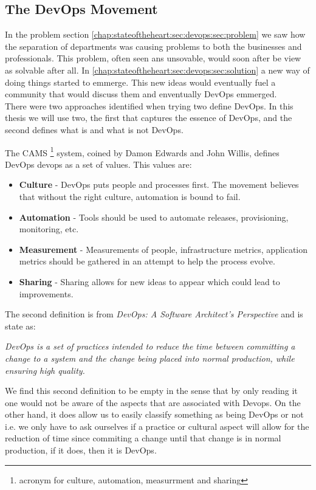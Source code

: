       \subsection{The DevOps Movement} \label{chap:stateoftheheart:sec:devops:sec:movement}
      In the problem section \ref{chap:stateoftheheart:sec:devops:sec:problem} we saw how the separation of departments was causing problems to both the businesses and professionals. This problem, often seen ans unsovable, would soon after be view as solvable after all. In \ref{chap:stateoftheheart:sec:devops:sec:solution} a new way of doing things started to emmerge. This new ideas would eventually fuel a community that would discuss them and enventually DevOps emmerged.\\
      There were two approaches identified when trying two define DevOps. In this thesis we will use two, the first that captures the essence of DevOps, and the second defines what is and what is not DevOps.

      The CAMS \footnote{acronym for culture, automation, measurrment and sharing} system, coined by Damon Edwards and John Willis, defines DevOps devops as a set of values. This values are:
      \begin{itemize}
          \item \textbf{Culture} - DevOps puts people and processes first. The movement believes that without the right culture, automation is bound to fail.
          \item \textbf{Automation} - Tools should be used to automate releases, provisioning, monitoring, etc.
          \item \textbf{Measurement} - Measurements of people, infrastructure metrics, application metrics should be gathered in an attempt to help the process evolve.
          \item \textbf{Sharing} - Sharing allows for new ideas to appear which could lead to improvements.
      \end{itemize}

      The second definition is from \textit{DevOps: A Software Architect's Perspective} \cite{Bass} and is state as:

      \textit{DevOps is a set of practices intended to reduce the time between committing a change to a system and the change being placed into normal production, while ensuring high quality.}

      We find this second definition to be empty in the sense that by only reading it one would not be aware of the aspects that are associated with Devops. On the other hand, it does allow us to easily classify something as being DevOps or not i.e. we only have to ask ourselves if a practice or cultural aspect will allow for the reduction of time since commiting a change until that change is in normal production, if it does, then it is DevOps.

